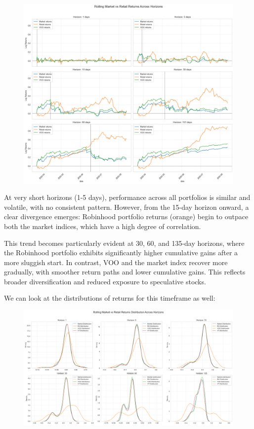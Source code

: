 \begin{figure}[h]
    \centering
    \includegraphics[width=1\linewidth]{Images/returns_comparison_pandemic.png}
\end{figure}
At very short horizons (1-5 days), performance across all portfolios is similar and volatile, with no consistent pattern. However, from the 15-day horizon onward, a clear divergence emerges: Robinhood portfolio returns (orange) begin to outpace both the market indices, which have a high degree of correlation.

This trend becomes particularly evident at 30, 60, and 135-day horizons, where the Robinhood portfolio exhibits significantly higher cumulative gains after a more sluggish start. 
In contrast, VOO and the market index recover more gradually, with smoother return paths and lower cumulative gains. This reflects broader diversification and reduced exposure to speculative stocks.

We can look at the distributions of returns for this timeframe as well:
\begin{figure}[H]
    \centering
    \includegraphics[width=1\linewidth]{Images/distributions_comparison_pandemic.png}
\end{figure}

